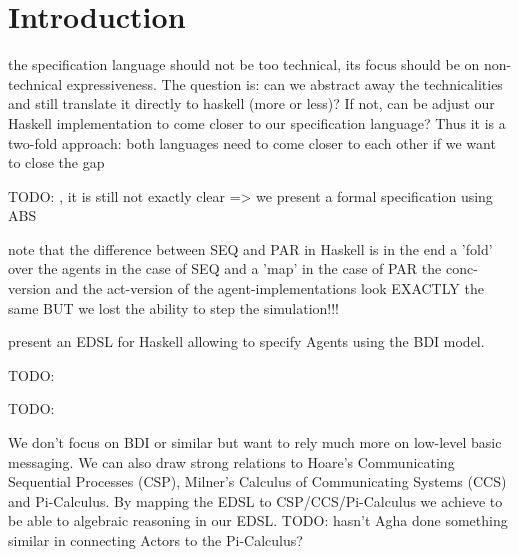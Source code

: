 \section{Introduction}
 the specification language should not be too technical, its focus should be on non-technical expressiveness. The question is: can we abstract away the technicalities and still translate it directly to haskell (more or less)? If not, can be adjust our Haskell implementation to come closer to our specification language? Thus it is a two-fold approach: both languages need to come closer to each other if we want to close the gap
 
TODO: \cite{nowak_evolutionary_1992}, \cite{huberman_evolutionary_1993}
it is still not exactly clear => we present a formal specification using ABS 
 
 note that the difference between SEQ and PAR in Haskell is in the end a 'fold' over the agents in the case of SEQ and a 'map' in the case of PAR
 the conc-version and the act-version of the agent-implementations look EXACTLY the same	 BUT we lost the ability to step the simulation!!!

\cite{sulzmann_specifying_2007} present an EDSL for Haskell allowing to specify Agents using the BDI model.

TODO: \cite{schneider_towards_2012}

TODO: \cite{vendrov_frabjous:_2014}


We don't focus on BDI or similar but want to rely much more on low-level basic messaging. We can also draw strong relations to Hoare's Communicating Sequential Processes (CSP), Milner's Calculus of Communicating Systems (CCS) and Pi-Calculus. By mapping the EDSL to CSP/CCS/Pi-Calculus we achieve to be able to algebraic reasoning in our EDSL. TODO: hasn't Agha done something similar in connecting Actors to the Pi-Calculus?